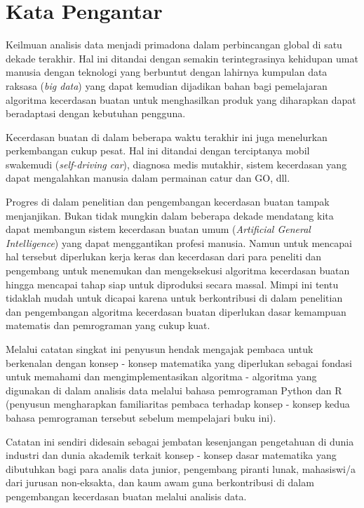 \chapter*{Kata Pengantar}

Keilmuan analisis data menjadi primadona dalam perbincangan global di satu dekade terakhir. Hal ini ditandai dengan semakin terintegrasinya kehidupan umat manusia dengan teknologi yang berbuntut dengan lahirnya kumpulan data raksasa (\textit{big data}) yang dapat kemudian dijadikan bahan bagi pemelajaran algoritma kecerdasan buatan untuk menghasilkan produk yang diharapkan dapat beradaptasi dengan kebutuhan pengguna. 

Kecerdasan buatan di dalam beberapa waktu terakhir ini juga menelurkan perkembangan cukup pesat. Hal ini ditandai dengan terciptanya mobil swakemudi (\textit{self-driving car}), diagnosa medis mutakhir, sistem kecerdasan yang dapat mengalahkan manusia dalam permainan catur dan GO, dll.

Progres di dalam penelitian dan pengembangan kecerdasan buatan tampak menjanjikan. Bukan tidak mungkin dalam beberapa dekade mendatang kita dapat membangun sistem kecerdasan buatan umum (\textit{Artificial General Intelligence}) yang dapat menggantikan profesi manusia. Namun untuk mencapai hal tersebut diperlukan kerja keras dan kecerdasan dari para peneliti dan pengembang untuk menemukan dan mengeksekusi algoritma kecerdasan buatan hingga mencapai tahap siap untuk diproduksi secara massal. Mimpi ini tentu tidaklah mudah untuk dicapai karena untuk berkontribusi di dalam penelitian dan pengembangan algoritma kecerdasan buatan diperlukan dasar kemampuan matematis dan pemrograman yang cukup kuat.

Melalui catatan singkat ini penyusun hendak mengajak pembaca untuk berkenalan dengan konsep - konsep matematika yang diperlukan sebagai fondasi untuk memahami dan mengimplementasikan algoritma - algoritma yang digunakan di dalam analisis data melalui bahasa pemrograman Python dan R (penyusun mengharapkan familiaritas pembaca terhadap konsep - konsep kedua bahasa pemrograman tersebut sebelum mempelajari buku ini). 

Catatan ini sendiri didesain sebagai jembatan kesenjangan pengetahuan di dunia industri dan dunia akademik terkait konsep - konsep dasar matematika yang dibutuhkan bagi para analis data junior, pengembang piranti lunak, mahasiswi/a dari jurusan non-eksakta, dan kaum awam guna berkontribusi di dalam pengembangan kecerdasan buatan melalui analisis data.

